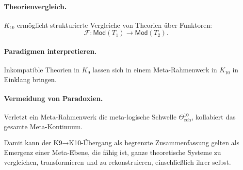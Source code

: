 \paragraph{Theorienvergleich.}
$K_{10}$ ermöglicht strukturierte Vergleiche von Theorien über Funktoren:
\[
\mathcal{F} : \mathsf{Mod}(T_1) \rightarrow \mathsf{Mod}(T_2).
\]

\paragraph{Paradigmen interpretieren.}
Inkompatible Theorien in $K_9$ lassen sich in einem
Meta-Rahmenwerk in $K_{10}$ in Einklang bringen.

\paragraph{Vermeidung von Paradoxien.}
Verletzt ein Meta-Rahmenwerk die meta-logische Schwelle
$\Theta^{10}_{\mathrm{coh}}$, kollabiert das gesamte Meta-Kontinuum.

Damit kann der K9→K10-Übergang als begrenzte Zusammenfassung gelten als
Emergenz einer Meta-Ebene, die fähig ist, ganze theoretische Systeme zu vergleichen,
transformieren und zu rekonstruieren, einschließlich ihrer selbst.
